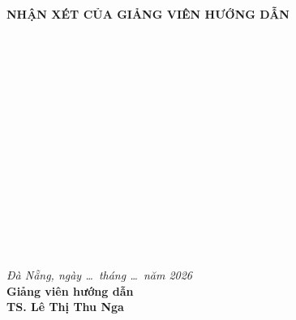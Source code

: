 \thispagestyle{empty}

\begin{center}
	{\fontsize{14pt}{18pt}\selectfont
		\textbf{NHẬN XÉT CỦA GIẢNG VIÊN HƯỚNG DẪN}}\\[25pt]
\end{center}

\noindent
\makebox[\textwidth]{\dotfill}\\[8pt]
\makebox[\textwidth]{\dotfill}\\[8pt]
\makebox[\textwidth]{\dotfill}\\[8pt]
\makebox[\textwidth]{\dotfill}\\[8pt]
\makebox[\textwidth]{\dotfill}\\[8pt]
\makebox[\textwidth]{\dotfill}\\[8pt]
\makebox[\textwidth]{\dotfill}\\[8pt]
\makebox[\textwidth]{\dotfill}\\[8pt]
\makebox[\textwidth]{\dotfill}\\[8pt]
\makebox[\textwidth]{\dotfill}\\[8pt]
\makebox[\textwidth]{\dotfill}\\[8pt]
\makebox[\textwidth]{\dotfill}\\[8pt]
\makebox[\textwidth]{\dotfill}\\[8pt]
\makebox[\textwidth]{\dotfill}\\[8pt]
\vspace{0.2cm}

\begin{flushright}
	\textit{Đà Nẵng, ngày \dots\ tháng \dots\ năm 2026}\\[12pt]
	\textbf{Giảng viên hướng dẫn}\\[50pt]
	\textbf{TS. Lê Thị Thu Nga}
\end{flushright}

\newpage